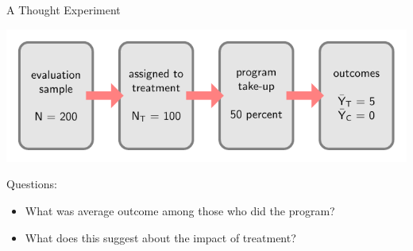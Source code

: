 \documentclass[10pt,xcolor=table,ignorenonframetext,aspectratio=169]{beamer}
\newlength{\wideitemsep}
\let\olditem\item
\renewcommand{\item}{\setlength{\itemsep}{\wideitemsep}\olditem}
\begin{document}
\begin{frame}{A Thought Experiment}

\medskip
\begin{center}
	
	\includegraphics[trim = 0mm 0mm 0mm 0mm, clip, width=\textwidth]{tikz/pathway.pdf}
	
\end{center}

\medskip
Questions:  

\medskip
\begin{itemize}
	
	\item What was average outcome among those who did the program?
	
	\item What does this suggest about the impact of treatment?
	
\end{itemize}

\end{frame}



\end{document}
